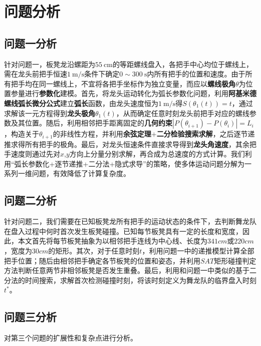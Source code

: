 
\section{问题分析}

\subsection{问题一分析}
针对问题一，板凳龙沿螺距为$55~\text{cm}$的等距螺线盘入，各把手中心均位于螺线上，需在龙头前把手恒速$1~\text{m/s}$条件下确定$0\sim300~\text{s}$内所有把手的位置和速度。由于所有把手均在同一螺线上，不宜将各把手坐标作为独立变量，而应以\textbf{螺线极角$\theta$}为位置参量进行\textbf{参数化}建模。首先，将龙头运动转化为弧长参数化问题，利用\textbf{阿基米德螺线弧长微分公式}建立\textbf{弧长}函数，由龙头速度恒为$1~\text{m/s}$得$\boxed{S(\theta_1(t))=t}$，通过求解该一元方程得到\textbf{龙头极角}$\theta_1(t)$，从而确定任意时刻龙头前把手对应的螺线参数及其位置。随后，利用相邻把手距离固定的\textbf{几何约束}$\boxed{\left| P(\theta_{i+1})-P(\theta_i) \right| = L_i}$，构造关于$\theta_{i+1}$的非线性方程，并利用\textbf{余弦定理$+$二分检验搜索求解}，之后逐节递推求得所有把手的极角。最后，对龙头恒速条件直接求导得到\textbf{龙头角速度}，其余把手速度则通过先对$x$,$y$方向上分量分别求解，再合成为总速度的方式计算。我们利用“弧长参数化+逐节递推+二分法+隐式求导”的策略，使多体运动问题分解为一系列一维问题，有效降低了计算复杂度。



\subsection{问题二分析}
针对问题二，我们需要在已知板凳龙所有把手的运动状态的条件下，去判断舞龙队在盘入过程中何时首次发生板凳碰撞。已知每节板凳具有一定的长度和宽度，因此，本文首先将每节板凳抽象为以相邻把手连线为中心线、长度为$341cm$或$220cm$，宽度为$30cm$的矩形。其次，对于任意时刻$t$，利用问题一中的递推模型计算全部把手位置；随后由相邻把手确定各节板凳的位置和姿态，并利用$SAT$矩形碰撞判定方法判断任意两节非相邻板凳是否发生重叠。最后，利用和问题一中类似的基于二分法的时间搜索，求解首次检测碰撞时刻，将该时刻定义为舞龙队的临界盘入时刻$t^*$。

\subsection{问题三分析}
对第三个问题的扩展性和复杂点进行分析。
